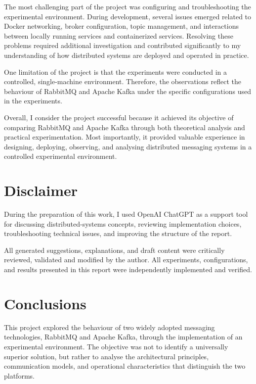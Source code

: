 \documentclass{scrartcl}
\begin{document}
The most challenging part of the project was configuring and troubleshooting the experimental environment. During development, several issues emerged related to Docker networking, broker configuration, topic management, and interactions between locally running services and containerized services. Resolving these problems required additional investigation and contributed significantly to my understanding of how distributed systems are deployed and operated in practice.

One limitation of the project is that the experiments were conducted in a controlled, single-machine environment. Therefore, the observations reflect the behaviour of RabbitMQ and Apache Kafka under the specific configurations used in the experiments.

Overall, I consider the project successful because it achieved its objective of comparing RabbitMQ and Apache Kafka through both theoretical analysis and practical experimentation. Most importantly, it provided valuable experience in designing, deploying, observing, and analysing distributed messaging systems in a controlled experimental environment.


\section*{Disclaimer}

During the preparation of this work, I used OpenAI ChatGPT as a support tool for discussing distributed-systems concepts, reviewing implementation choices, troubleshooting technical issues, and improving the structure of the report.

All generated suggestions, explanations, and draft content were critically reviewed, validated and modified by the author. All experiments, configurations, and results presented in this report were independently implemented and verified.

\section{Conclusions}

This project explored the behaviour of two widely adopted messaging technologies, RabbitMQ and Apache Kafka, through the implementation of an experimental environment. The objective was not to identify a universally superior solution, but rather to analyse the architectural principles, communication models, and operational characteristics that distinguish the two platforms.
\end{document}
